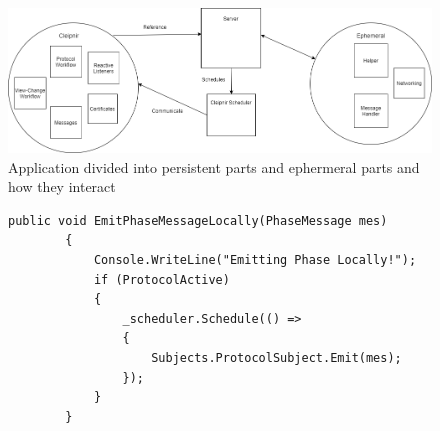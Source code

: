 \begin{figure}[H]
	\includegraphics[width=\linewidth]{figures/CleipnirStructure}
	\caption{Application divided into persistent parts and ephermeral parts and how they interact}
	\label{fig:PersistencyEphemeral}
\end{figure}

\begin{figure}[h]
	\centering
	\begin{lstlisting}[label = code:schedulerEmit, caption= Example of server and protocol interaction using Cleipnir scheduler, captionpos=b, basicstyle=\scriptsize]
	public void EmitPhaseMessageLocally(PhaseMessage mes)
        {
            Console.WriteLine("Emitting Phase Locally!");
            if (ProtocolActive)
            {
                _scheduler.Schedule(() =>
                {
                    Subjects.ProtocolSubject.Emit(mes);
                });    
            }
        }
	\end{lstlisting}
\end{figure}